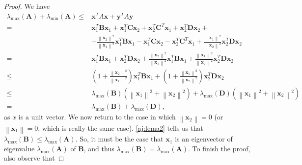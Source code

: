 \documentclass{article}
\begin{document}
\begin{proof}
We have
$$
\begin{aligned}
\lambda_{\max }(\boldsymbol{A})+\lambda_{\min }(\boldsymbol{A}) \leq & \boldsymbol{x}^{T} A \boldsymbol{x}+\boldsymbol{y}^{T} A \boldsymbol{y} \\
=& \boldsymbol{x}_{1}^{T} \boldsymbol{B} \boldsymbol{x}_{1}+\boldsymbol{x}_{1}^{T} \boldsymbol{C} \boldsymbol{x}_{2}+\boldsymbol{x}_{2}^{T} \boldsymbol{C}^{T} \boldsymbol{x}_{1}+\boldsymbol{x}_{2}^{T} \boldsymbol{D} \boldsymbol{x}_{2}+\\
&+\frac{\left\|\boldsymbol{x}_{2}\right\|^{2}}{\left\|\boldsymbol{x}_{1}\right\|^{2}} \boldsymbol{x}_{1}^{T} \boldsymbol{B} \boldsymbol{x}_{1}-\boldsymbol{x}_{1}^{T} \boldsymbol{C} \boldsymbol{x}_{2}-\boldsymbol{x}_{2}^{T} \boldsymbol{C}^{T} \boldsymbol{x}_{1}+\frac{\left\|\boldsymbol{x}_{1}\right\|^{2}}{\left\|\boldsymbol{x}_{2}\right\|^{2}} \boldsymbol{x}_{2}^{T} \boldsymbol{D} \boldsymbol{x}_{2} \\
=& \boldsymbol{x}_{1}^{T} \boldsymbol{B} \boldsymbol{x}_{1}+\boldsymbol{x}_{2}^{T} \boldsymbol{D} \boldsymbol{x}_{2}+\frac{\left\|\boldsymbol{x}_{2}\right\|^{2}}{\left\|\boldsymbol{x}_{1}\right\|^{2}} \boldsymbol{x}_{1}^{T} \boldsymbol{B} \boldsymbol{x}_{1}+\frac{\left\|\boldsymbol{x}_{1}\right\|^{2}}{\left\|\boldsymbol{x}_{2}\right\|^{2}} \boldsymbol{x}_{2}^{T} \boldsymbol{D} \boldsymbol{x}_{2} \\
\leq &\left(1+\frac{\left\|\boldsymbol{x}_{2}\right\|^{2}}{\left\|\boldsymbol{x}_{1}\right\|^{2}}\right) \boldsymbol{x}_{1}^{T} \boldsymbol{B} \boldsymbol{x}_{1}+\left(1+\frac{\left\|\boldsymbol{x}_{1}\right\|^{2}}{\left\|\boldsymbol{x}_{2}\right\|^{2}}\right) \boldsymbol{x}_{2}^{T} \boldsymbol{D} \boldsymbol{x}_{2} \\
\leq & \lambda_{\max }(\boldsymbol{B})\left(\left\|\boldsymbol{x}_{1}\right\|^{2}+\left\|\boldsymbol{x}_{2}\right\|^{2}\right)+\lambda_{\max }(\boldsymbol{D})\left(\left\|\boldsymbol{x}_{1}\right\|^{2}+\left\|\boldsymbol{x}_{2}\right\|^{2}\right) \\
=& \lambda_{\max }(\boldsymbol{B})+\lambda_{\max }(\boldsymbol{D}),
\end{aligned}
$$
as $x$ is a unit vector.
We now return to the case in which $\left\|\boldsymbol{x}_{2}\right\|=0$ (or $\left\|\boldsymbol{x}_{1}\right\|=0$, which is really the same case). \cref{aj:lema2}  tells us that $\lambda_{\max }(\boldsymbol{B}) \leq \lambda_{\max }(\boldsymbol{A})$. So, it must be the case that $\boldsymbol{x}_{1}$ is an eigenvector of eigenvalue $\lambda_{\max }(\boldsymbol{A})$ of $\boldsymbol{B}$, and thus $\lambda_{\max }(\boldsymbol{B})=\lambda_{\max }(\boldsymbol{A})$. To finish the proof, also observe that

\end{proof}
\end{document}
